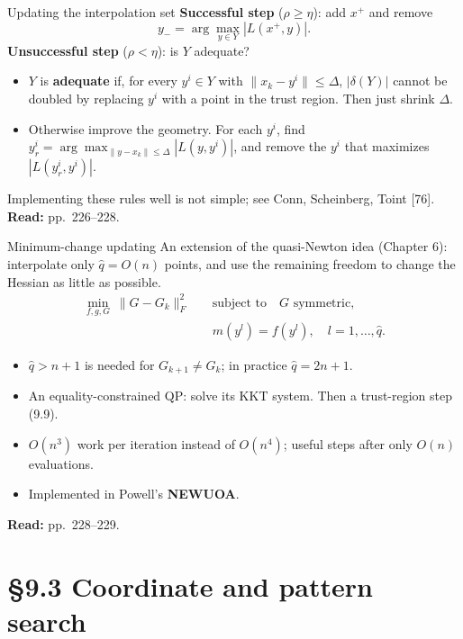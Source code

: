 \documentclass[12pt,aspectratio=169]{beamer}
\newcommand{\readpp}[1]{{\color{red!80!black}\textbf{Read:} #1}}
\begin{document}
\begin{frame}{Updating the interpolation set}
  \textbf{Successful step} ($\rho\ge\eta$): add $x^+$ and remove
  \[
    y_- = \arg\max_{y\in Y}|L(x^+,y)|.
  \]
  \textbf{Unsuccessful step} ($\rho<\eta$): is $Y$ adequate?
  \begin{itemize}
    \item $Y$ is \textbf{adequate} if, for every $y^i\in Y$ with $\|x_k-y^i\|\le\Delta$,
      $|\delta(Y)|$ cannot be doubled by replacing $y^i$ with a point in the trust region.
      Then just shrink $\Delta$.
    \item Otherwise improve the geometry. For each $y^i$, find
      $y_r^i = \arg\max_{\|y-x_k\|\le\Delta}|L(y,y^i)|$,
      and remove the $y^i$ that maximizes $|L(y_r^i,y^i)|$.
  \end{itemize}
  Implementing these rules well is not simple; see Conn, Scheinberg, Toint [76].
  \readpp{pp.~226--228.}
\end{frame}

\begin{frame}{Minimum-change updating}
  An extension of the quasi-Newton idea (Chapter 6): interpolate only $\hat q=O(n)$ points,
  and use the remaining freedom to change the Hessian as little as possible.
  \begin{subequations}
  \begin{align}
    \min_{f,g,G}\ \|G-G_k\|_F^2 \quad &\text{subject to}\quad G \text{ symmetric}, \tag{9.19a}\\
    & m(y^l)=f(y^l),\quad l=1,\dots,\hat q. \tag{9.19b}
  \end{align}
  \end{subequations}
  \begin{itemize}
    \item $\hat q>n+1$ is needed for $G_{k+1}\neq G_k$; in practice $\hat q=2n+1$.
    \item An equality-constrained QP: solve its KKT system. Then a trust-region step (9.9).
    \item $O(n^3)$ work per iteration instead of $O(n^4)$; useful steps after only $O(n)$ evaluations.
    \item Implemented in Powell's \textbf{NEWUOA}.
  \end{itemize}
  \readpp{pp.~228--229.}
\end{frame}

\section{\S9.3 Coordinate and pattern search}
\end{document}
